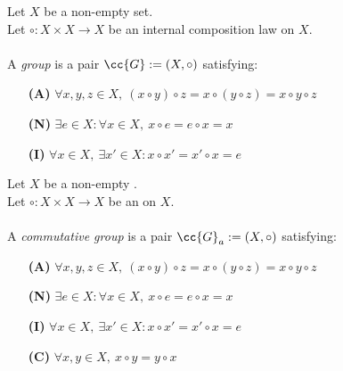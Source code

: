 \begin{definition}[Group]
    \label{def:group}
    Let \(X\) be a non-empty set.\\
    Let \(\circ: X\times X \to X\) be an internal composition law on \(X\). \\\\
    A \textit{group} is a pair \(\cc{G}:= (X, \circ)\) satisfying:
    \begin{enumerate}
        \item [\textbf{(A)}] \(\forall x,y,z\in X,\ (x\circ y)\circ z= x\circ (y\circ z) = x\circ y \circ z\)
        \item [\textbf{(N)}] \(\exists e \in X : \forall x \in X,\ x\circ e = e \circ x = x\)
        \item [\textbf{(I)}] \(\forall x \in X,\ \exists x'\in X: x\circ x' = x'\circ x = e\)
    \end{enumerate}
\end{definition}
\begin{definition}
    \label{def:commutative_group}
    Let \(X\) be a non-empty .\\
    Let \(\circ: X\times X \to X\) be an  on \(X\). \\\\
    A \textit{commutative group} is a pair \(\cc{G}_a:= (X, \circ)\) satisfying:
    \begin{enumerate}
        \item [\textbf{(A)}] \(\forall x,y,z\in X,\ (x\circ y)\circ z= x\circ (y\circ z) = x\circ y \circ z\)
        \item [\textbf{(N)}] \(\exists e \in X : \forall x \in X,\ x\circ e = e \circ x = x\)
        \item [\textbf{(I)}] \(\forall x \in X,\ \exists x'\in X: x\circ x' = x'\circ x = e\)
        \item [\textbf{(C)}] \(\forall x,y\in X,\ x\circ y = y\circ x\)
    \end{enumerate}
\end{definition}

\begin{definition}[Semiring]
    \label{def:semiring}
\end{definition}

\begin{definition}
    \label{def:commutative_semiring}
\end{definition}

